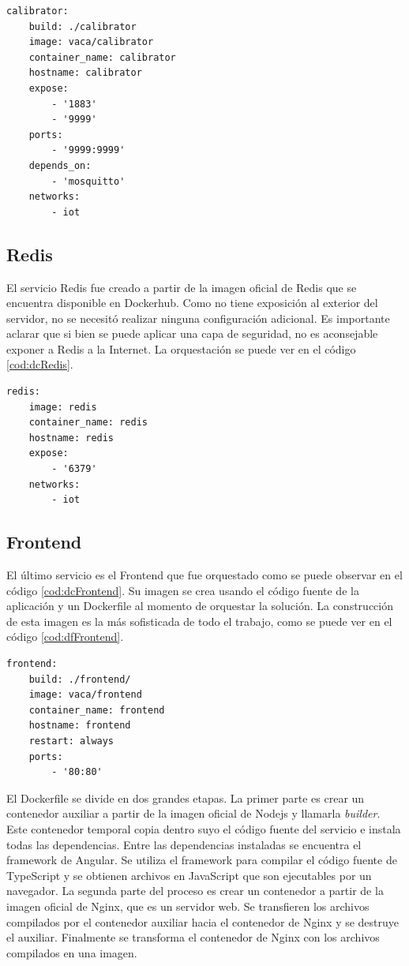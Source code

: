\begin{lstlisting}[label=cod:dcCalibrator,caption=Orquestación del servicio Calibrator.]
calibrator:
	build: ./calibrator
	image: vaca/calibrator
	container_name: calibrator
	hostname: calibrator
	expose: 
		- '1883'
		- '9999'
	ports:
		- '9999:9999'
	depends_on: 
		- 'mosquitto'
	networks: 
		- iot
\end{lstlisting}

\subsection{Redis}

El servicio Redis fue creado a partir de la imagen oficial de Redis que se encuentra disponible en Dockerhub. \citep{contrib:redis}
Como no tiene exposición al exterior del servidor, no se necesitó realizar ninguna configuración adicional.
Es importante aclarar que si bien se puede aplicar una capa de seguridad, no es aconsejable exponer a Redis a la Internet.
La orquestación se puede ver en el código \ref{cod:dcRedis}.

\begin{lstlisting}[label=cod:dcRedis,caption=Orquestación del servicio Redis.]
redis:
	image: redis
	container_name: redis
	hostname: redis
	expose:
		- '6379'
	networks: 
		- iot
\end{lstlisting}

\subsection{Frontend}

El último servicio es el Frontend que fue orquestado como se puede observar en el código \ref{cod:dcFrontend}.
Su imagen se crea usando el código fuente de la aplicación y un Dockerfile al momento de orquestar la solución.
La construcción de esta imagen es la más sofisticada de todo el trabajo, como se puede ver en el código \ref{cod:dfFrontend}.

\begin{lstlisting}[label=cod:dcFrontend,caption=Orquestación del servicio Frontend.]
frontend:
	build: ./frontend/
	image: vaca/frontend
	container_name: frontend
	hostname: frontend
	restart: always
	ports: 
		- '80:80'
\end{lstlisting}

El Dockerfile se divide en dos grandes etapas.
La primer parte es crear un contenedor auxiliar a partir de la imagen oficial de Nodejs y llamarla \emph{builder}.
Este contenedor temporal copia dentro suyo el código fuente del servicio e instala todas las dependencias.
Entre las dependencias instaladas se encuentra el framework de Angular.
Se utiliza el framework para compilar el código fuente de TypeScript y se obtienen archivos en JavaScript que son ejecutables por un navegador.
La segunda parte del proceso es crear un contenedor a partir de la imagen oficial de Nginx, que es un servidor web.
Se transfieren los archivos compilados por el contenedor auxiliar hacia el contenedor de Nginx y se destruye el auxiliar.
Finalmente se transforma el contenedor de Nginx con los archivos compilados en una imagen.

